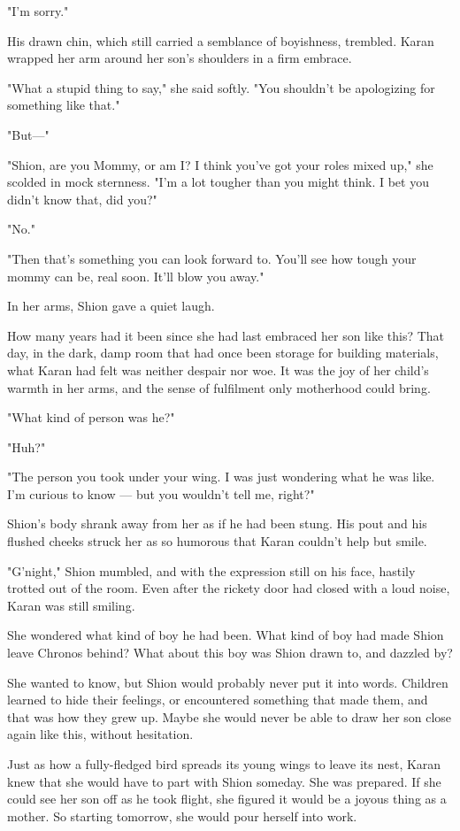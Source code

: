 "I'm sorry."

His drawn chin, which still carried a semblance of boyishness, trembled.
Karan wrapped her arm around her son's shoulders in a firm embrace.

"What a stupid thing to say," she said softly. "You shouldn't be
apologizing for something like that."

"But---"

"Shion, are you Mommy, or am I? I think you've got your roles mixed up,"
she scolded in mock sternness. "I'm a lot tougher than you might think.
I bet you didn't know that, did you?"

"No."

"Then that's something you can look forward to. You'll see how tough
your mommy can be, real soon. It'll blow you away."

In her arms, Shion gave a quiet laugh.

How many years had it been since she had last embraced her son like
this? That day, in the dark, damp room that had once been storage for
building materials, what Karan had felt was neither despair nor woe. It
was the joy of her child's warmth in her arms, and the sense of
fulfilment only motherhood could bring.

"What kind of person was he?"

"Huh?"

"The person you took under your wing. I was just wondering what he was
like. I'm curious to know --- but you wouldn't tell me, right?"

Shion's body shrank away from her as if he had been stung. His pout and
his flushed cheeks struck her as so humorous that Karan couldn't help
but smile.

"G'night," Shion mumbled, and with the expression still on his face,
hastily trotted out of the room. Even after the rickety door had closed
with a loud noise, Karan was still smiling.

She wondered what kind of boy he had been. What kind of boy had made
Shion leave Chronos behind? What about this boy was Shion drawn to, and
dazzled by?

She wanted to know, but Shion would probably never put it into words.
Children learned to hide their feelings, or encountered something that
made them, and that was how they grew up. Maybe she would never be able
to draw her son close again like this, without hesitation.

Just as how a fully-fledged bird spreads its young wings to leave its
nest, Karan knew that she would have to part with Shion someday. She was
prepared. If she could see her son off as he took flight, she figured it
would be a joyous thing as a mother. So starting tomorrow, she would
pour herself into work.

